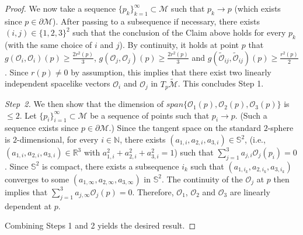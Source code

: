 \documentclass[10pt, reqno]{amsart}
\theoremstyle{definition}
\theoremstyle{remark}
\numberwithin{equation}{section}
\newcommand{\rd}{\partial}
\newcommand{\0}{\emptyset}
\newcommand{\f}{\frac}
\newcommand{\pfstep}[1]{\vspace{.5em} {\it \noindent #1.}}
\begin{document}
\begin{proof}
We now take a sequence $\{p_k\}_{k=1}^\infty\subset \mathcal M $ such that $p_k\to p$ (which exists since $p\in \rd\mathcal M$). After passing to a subsequence if necessary, there exists $(i,j)\in \{1,2,3\}^2$ such that the conclusion of the Claim above holds for every $p_k$ (with the same choice of $i$ and $j$). By continuity, it holds at point $p$ that $g(\mathcal O_i,\mathcal O_i)(p)\geq \f{2 r^2(p)}{3}$, $g(\mathcal O_j,\mathcal O_j)(p)\geq \f{2 r^2(p)}{3}$ and $g(\widetilde{\mathcal O}_{ij},\widetilde{\mathcal O}_{ij})(p)\geq \f{r^2(p)}{2}$. Since $r(p)\neq 0$ by assumption, this implies that there exist two linearly independent spacelike vectors $\mathcal O_i$ and $\mathcal O_j$ in $T_p\widetilde{\mathcal M}$. This concludes Step 1.

\pfstep{Step~2} We then show that the dimension of $span\{\mathcal O_1(p), \mathcal O_2(p), \mathcal O_3(p)\}$ is $\leq 2$. Let $\{p_i\}_{i=1}^\infty\subset \mathcal M$ be a sequence of points such that $p_i\to p$. (Such a sequence exists since $p\in \rd \mathcal M$.) Since the tangent space on the standard $2$-sphere is $2$-dimensional, for every $i\in \mathbb N$, there exists $(a_{1,i}, a_{2,i}, a_{3,i})\in \mathbb S^2$, (i.e., $(a_{1,i}, a_{2,i}, a_{3,i})\in \mathbb R^3$ with $a_{1,i}^2 + a_{2,i}^2 + a_{3,i}^2=1$) such that $\sum_{j=1}^3 a_{j,i}\mathcal O_j(p_i)=0$. Since $\mathbb S^2$ is compact, there exists a subsequence $i_k$ such that $(a_{1,i_k}, a_{2,i_k}, a_{3,i_k})$ converges to some $(a_{1,\infty}, a_{2,\infty}, a_{3,\infty})$ in $\mathbb S^2$. The continuity of the $\mathcal O_j$ at $p$ then implies that $\sum_{j=1}^3 a_{j,\infty}\mathcal O_j(p)=0$. Therefore, $\mathcal O_1$, $\mathcal O_2$ and $\mathcal O_3$ are linearly dependent at $p$.

Combining Steps 1 and 2 yields the desired result.
\end{proof}
\end{document}
